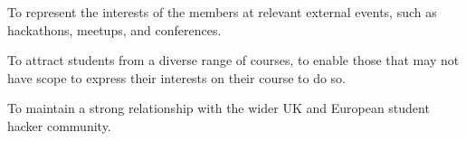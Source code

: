 	\begin{subclause}
		To represent the interests of the members at relevant external events, such as hackathons, meetups, and conferences.
	\end{subclause}
	
	\begin{subclause}
 		To attract students from a diverse range of courses, to enable those that may not have scope to express their interests on their course to do so.
	\end{subclause}
	
	\begin{subclause}
 		To maintain a strong relationship with the wider UK and European student hacker community.
	\end{subclause}
